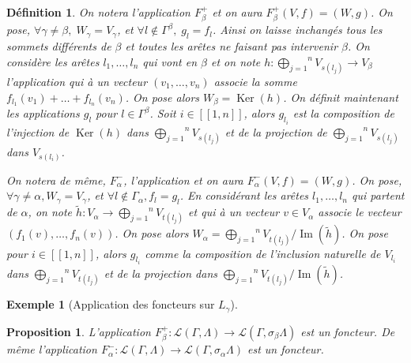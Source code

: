 \documentclass[a4paper,10pt]{article}
\newtheorem{defi}[thm]{Définition}%
\newtheorem{prop}[thm]{Proposition}%
\newtheorem{ex}[thm]{Exemple}%
\DeclareMathOperator{\Ker}{Ker}
\DeclareMathOperator{\Img}{Im}
\begin{document}
\begin{defi}
	On notera l'application $F_{\beta}^{+}$ et on aura $F_{\beta}^{+}(V,f)=(W,g)$. On pose, $\forall \gamma\neq\beta,\;W_{\gamma}=V_{\gamma}$, et $\forall l \notin \Gamma^{\beta},\; g_{l}=f_{l}$. Ainsi on laisse inchangés tous les sommets différents de $\beta$ et toutes les arêtes ne faisant pas intervenir $\beta$. On considère les arêtes $l_{1},\dots,l_{n}$ qui vont en $\beta$ et on note $h:\overset{n}{\underset{j=1}{\bigoplus}}V_{s(l_{j})}\rightarrow V_{\beta}$ l'application qui à un vecteur $(v_{1},\dots,v_{n})$ associe la somme $f_{l_{1}}(v_{1})+\dots+f_{l_{n}}(v_{n})$. On pose alors $W_{\beta}=\Ker(h)$. On définit maintenant les applications $g_{l}$ pour $l\in\Gamma^{\beta}$. Soit $i\in[\![1,n]\!]$, alors $g_{l_{i}}$ est la composition de l'injection de $\Ker(h)$ dans $\overset{n}{\underset{j=1}{\bigoplus}}V_{s(l_{j})}$ et de la projection de $\overset{n}{\underset{j=1}{\bigoplus}}V_{s(l_{j})}$ dans $V_{s(l_{i})}$. 

	On notera de même, $F^{-}_{\alpha}$, l'application et on aura $F^{-}_{\alpha}(V,f) = (W,g)$. On pose, $\forall \gamma \neq \alpha, W_\gamma = V_\gamma$, et $\forall l \notin \Gamma_\alpha, f_l = g_l$. En considérant les arêtes $l_1, \dots, l_n$ qui partent de $\alpha$, on note $\widetilde{h} : V_\alpha \rightarrow \overset{n}{\underset{j=1}{\bigoplus}}V_{t(l_{j})}$ et qui à un vecteur $v \in V_\alpha$ associe le vecteur $(f_1(v),\dots, f_n(v))$. On pose alors $W_\alpha = \overset{n}{\underset{j=1}{\bigoplus}}V_{t(l_{j})}/\Img(\widetilde{h})$. On pose pour $i\in [\![1,n]\!]$, alors $g_{l_i}$ comme la composition de l'inclusion naturelle de $V_{l_i}$ dans $\overset{n}{\underset{j=1}{\bigoplus}}V_{t(l_{j})}$ et de la projection dans $\overset{n}{\underset{j=1}{\bigoplus}}V_{t(l_{j})}/\Img(\widetilde h)$.

\end{defi}

\begin{ex}[Application des foncteurs sur $L_{\gamma}$]
  
\end{ex}

\begin{prop}
	L'application $F_{\beta}^{+}:\mathscr{L}(\Gamma,\Lambda)\rightarrow\mathscr{L}(\Gamma,\sigma_{\beta}\Lambda)$ est un foncteur. De même l'application $F_{\alpha}^{-}:\mathscr{L}(\Gamma,\Lambda)\rightarrow\mathscr{L}(\Gamma,\sigma_{\alpha}\Lambda)$ est un foncteur.
\end{prop}
\end{document}
